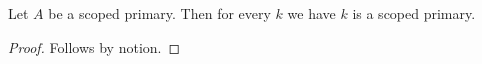 

\begin{proposition}\label{horn_scoped_missing}
    Let $A$ be a scoped primary.
    Then for every $k$ we have $k$ is a scoped primary.
\end{proposition}
\begin{proof}
    Follows by notion.
\end{proof}
